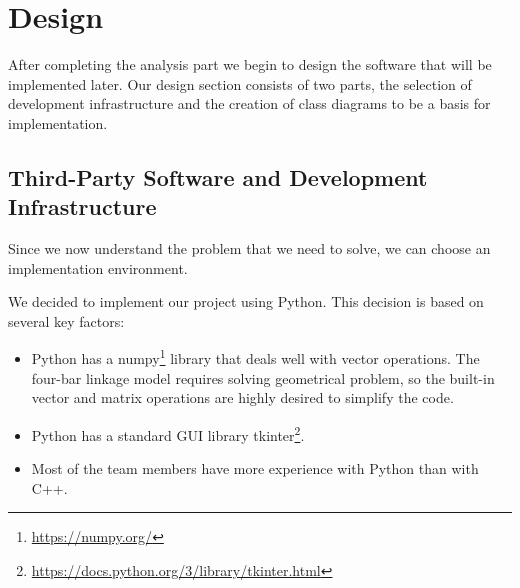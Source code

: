 \documentclass{article}
\begin{document}




\section{Design} \label{ch:design}

After completing the analysis part we begin to design the software that will be implemented later. Our design section consists of two parts, the selection of development infrastructure and the creation of class diagrams to be a basis for implementation.

\subsection{Third-Party Software and Development Infrastructure}

Since we now understand the problem that we need to solve, we can choose an implementation environment.

We decided to implement our project using Python. This decision is based on several key factors:
\begin{itemize}
	\item Python has a numpy\footnote{\label{fn:numpy} \url{https://numpy.org/}} library that deals well with vector operations. The four-bar linkage model requires solving geometrical problem, so the built-in vector and matrix operations are highly desired to simplify the code.
	\item Python has a standard GUI library tkinter\footnote{\label{fn:tkinter} \url{https://docs.python.org/3/library/tkinter.html}}.
	\item Most of the team members have more experience with Python than with C++.
\end{itemize}
\end{document}
